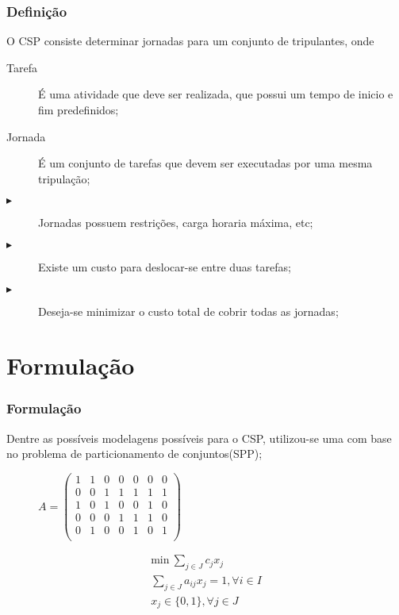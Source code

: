 \documentclass{beamer}
\begin{document}
\begin{frame}
    \frametitle{Definição}

    O CSP consiste determinar jornadas para um conjunto de tripulantes, onde

    \begin{description}
        \item[Tarefa] É uma atividade que deve ser realizada, que possui um tempo de inicio e fim predefinidos;
        \item[Jornada] É um conjunto de tarefas que devem ser executadas por uma mesma tripulação;
        \item[$\blacktriangleright$]Jornadas possuem restrições, carga horaria máxima, etc;
        \item[$\blacktriangleright$]Existe um custo para deslocar-se entre duas tarefas;
        \item[$\blacktriangleright$]Deseja-se minimizar o custo total de cobrir todas as jornadas;
    \end{description}
\end{frame}

\section{Formulação}
\begin{frame}
    \frametitle{Formulação}
    Dentre as possíveis modelagens possíveis para o CSP, utilizou-se uma com base no problema de particionamento de conjuntos(SPP);

    \begin{figure}[!htb]
        \centering
        \begin{minipage}{0.48\textwidth}
            $A = \begin{pmatrix}
                1 & 1 & 0 & 0 & 0 & 0 & 0 \\
                0 & 0 & 1 & 1 & 1 & 1 & 1 \\
                1 & 0 & 1 & 0 & 0 & 1 & 0 \\
                0 & 0 & 0 & 1 & 1 & 1 & 0 \\
                0 & 1 & 0 & 0 & 1 & 0 & 1 \\
            \end{pmatrix}$
        \end{minipage}
%
        \begin{minipage}{.48\textwidth}
            \begin{subequations}
                \label{spppp}
                \begin{align}
                \label{spp2}  \text{min} \: \sum_{j \in J} c_j x_j \\
                \label{spp22} \sum_{j \in J} a_{ij} x_j = 1, \forall i \in I \\
                \label{spp24} x_j \in \{0, 1\}, \forall j \in J
            \end{align}
        \end{subequations}
        \end{minipage}
    \end{figure}
\end{frame}
\end{document}
